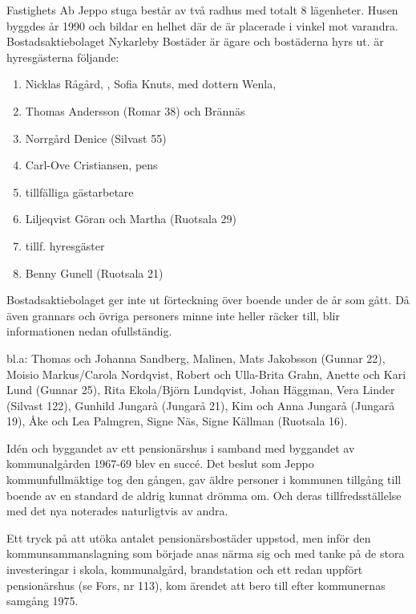 Fastighets Ab Jeppo stuga består av två radhus med totalt 8 lägenheter. Husen byggdes år 1990 och bildar en helhet där de är placerade i vinkel mot varandra. Bostadsaktiebolaget Nykarleby Bostäder är ägare och bostäderna hyrs ut.
 är hyresgästerna följande:
\begin{enumerate}
  \item Nicklas Rågård, , Sofia Knuts,  med dottern Wenla, 
  \item Thomas Andersson (Romar 38) och Brännäs
  \item Norrgård Denice (Silvast 55)
  \item Carl-Ove Cristiansen, pens
  \item tillfälliga gästarbetare
  \item Liljeqvist Göran och  Martha (Ruotsala 29)
  \item tillf. hyresgäster
  \item Benny Gunell (Ruotsala 21)
\end{enumerate}

Bostadsaktiebolaget ger inte ut förteckning över boende under de år som gått. Då även grannars och övriga personers minne inte heller räcker till, blir informationen nedan ofullständig.

 bl.a: Thomas och Johanna Sandberg, Malinen, Mats Jakobsson (Gunnar 22), Moisio Markus/Carola Nordqvist, Robert och Ulla-Brita Grahn, Anette och Kari Lund (Gunnar 25), Rita Ekola/Björn Lundqvist, Johan Häggman,  Vera Linder (Silvast 122), Gunhild Jungarå (Jungarå 21), Kim och Anna Jungarå (Jungarå 19), Åke och Lea Palmgren, Signe Näs, Signe Källman (Ruotsala 16). \jhvspace{}






Idén och byggandet av ett pensionärshus i samband med byggandet av kommunalgården 1967-69 blev en succé. Det beslut som Jeppo kommunfullmäktige tog den gången, gav äldre personer i kommunen tillgång till boende av en standard de aldrig kunnat drömma om. Och deras tillfredsställelse med det nya noterades naturligtvis av andra.

Ett tryck på att utöka antalet pensionärsbostäder uppstod, men inför den kommunsammanslagning som började anas närma sig och med tanke på de stora investeringar i skola, kommunalgård, brandstation och ett redan uppfört pensionärshus (se Fors,  nr 113), kom ärendet att bero till efter kommunernas samgång 1975.

